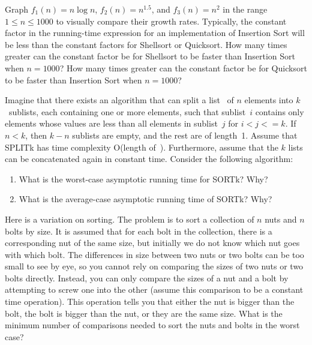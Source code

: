 \begin{exercises}
\item
Graph \(f_1(n) = n \log n\), \(f_2(n) = n^{1.5}\),
and \(f_3(n) = n^2\) in the range \(1 \leq n \leq 1000\) to visually
compare their growth rates.
Typically, the constant factor in the running-time expression for an
implementation of Insertion Sort
will be less than the constant factors for
Shellsort or
Quicksort.
How many times greater can the constant factor be for Shellsort to be
faster than Insertion Sort when \(n = 1000\)?
How many times greater can the constant factor be for Quicksort to be
faster than Insertion Sort when \(n = 1000\)?

\item
Imagine that there exists an algorithm  that can
split a list~ of \(n\) elements into \(k\)~sublists, each
containing one or more elements, such that sublist~\(i\) contains only
elements whose values are less than all elements in sublist~\(j\) for
\(i < j <= k\). 
If \(n < k\), then \(k - n\) sublists are empty, and the rest are of
length~1.
Assume that SPLITk has time complexity O(length of~).
Furthermore, assume that the \(k\) lists can be concatenated
again in constant time.  Consider the following algorithm:


\begin{enumerate}
\item
What is the worst-case asymptotic running time for SORTk? Why?

\item
What is the average-case asymptotic running time of SORTk? Why?
\end{enumerate}

\item
Here is a variation on sorting.
The problem is to sort a collection of \(n\) nuts and \(n\) bolts by
size.
It is assumed that for each bolt in the collection, there is a
corresponding nut of the same size, but initially we do not know which
nut goes with which bolt.
The differences in size between two nuts or two bolts can be too small
to see by eye, so you cannot rely on comparing the sizes of two nuts
or two bolts directly.
Instead, you can only compare the sizes of a nut and a bolt by
attempting to screw one into the other (assume this comparison to be a
constant time operation).
This operation tells you that either the nut is bigger than the bolt,
the bolt is bigger than the nut, or they are the same size.
What is the minimum number of comparisons needed to sort the nuts and
bolts in the worst case?


\end{exercises}
